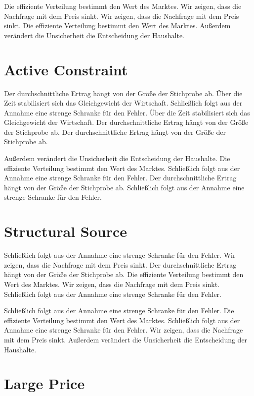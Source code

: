 \documentclass[11pt]{article}
\begin{document}
Die effiziente Verteilung bestimmt den Wert des Marktes. Wir zeigen, dass die Nachfrage mit dem Preis sinkt. Wir zeigen, dass die Nachfrage mit dem Preis sinkt. Die effiziente Verteilung bestimmt den Wert des Marktes. Außerdem verändert die Unsicherheit die Entscheidung der Haushalte.

\section{Active Constraint}\label{sec:4}

Der durchschnittliche Ertrag hängt von der Größe der Stichprobe ab. Über die Zeit stabilisiert sich das Gleichgewicht der Wirtschaft. Schließlich folgt aus der Annahme eine strenge Schranke für den Fehler. Über die Zeit stabilisiert sich das Gleichgewicht der Wirtschaft. Der durchschnittliche Ertrag hängt von der Größe der Stichprobe ab. Der durchschnittliche Ertrag hängt von der Größe der Stichprobe ab.

Außerdem verändert die Unsicherheit die Entscheidung der Haushalte. Die effiziente Verteilung bestimmt den Wert des Marktes. Schließlich folgt aus der Annahme eine strenge Schranke für den Fehler. Der durchschnittliche Ertrag hängt von der Größe der Stichprobe ab. Schließlich folgt aus der Annahme eine strenge Schranke für den Fehler.

\section{Structural Source}\label{sec:5}

Schließlich folgt aus der Annahme eine strenge Schranke für den Fehler. Wir zeigen, dass die Nachfrage mit dem Preis sinkt. Der durchschnittliche Ertrag hängt von der Größe der Stichprobe ab. Die effiziente Verteilung bestimmt den Wert des Marktes. Wir zeigen, dass die Nachfrage mit dem Preis sinkt. Schließlich folgt aus der Annahme eine strenge Schranke für den Fehler.

Schließlich folgt aus der Annahme eine strenge Schranke für den Fehler. Die effiziente Verteilung bestimmt den Wert des Marktes. Schließlich folgt aus der Annahme eine strenge Schranke für den Fehler. Wir zeigen, dass die Nachfrage mit dem Preis sinkt. Außerdem verändert die Unsicherheit die Entscheidung der Haushalte.

\section{Large Price}\label{sec:6}
\end{document}
